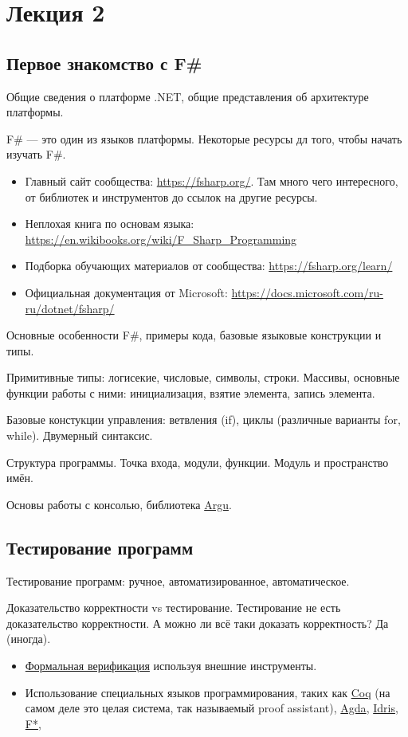 \section{Лекция 2}

\subsection{Первое знакомство с F\#}

    Общие сведения о платформе .NET, общие представления об архитектуре платформы.

    F\# --- это один из языков платформы. 
    Некоторые ресурсы дл того, чтобы начать изучать F\#.
    \begin{itemize}
    	\item Главный сайт сообщества: \url{https://fsharp.org/}. Там много чего интересного, от библиотек и инструментов до ссылок на другие ресурсы. 
    	\item Неплохая книга по основам языка: \url{https://en.wikibooks.org/wiki/F_Sharp_Programming}
    	\item Подборка обучающих материалов от сообщества: \url{https://fsharp.org/learn/}
    	\item Официальная документация от Microsoft: \url{https://docs.microsoft.com/ru-ru/dotnet/fsharp/}
    \end{itemize}
    Основные особенности F\#, примеры кода, базовые языковые конструкции и типы.

    Примитивные типы: логисекие, числовые, символы, строки.
    Массивы, основные функции работы с ними: инициализация, взятие элемента, запись элемента.

    Базовые констукции управления: ветвления (if), циклы (различные варианты for, while). 
    Двумерный синтаксис.

    Структура программы. Точка входа, модули, функции. Модуль и пространство имён.

    Основы работы с консолью, библиотека \href{https://fsprojects.github.io/Argu/}{Argu}. 

\subsection{Тестирование программ}
    Тестирование программ: ручное, автоматизированное, автоматическое. 

    Доказательство корректности vs тестирование. Тестирование не есть доказательство корректности.
    А можно ли всё таки доказать корректность? Да (иногда).
    \begin{itemize}
    	\item \href{https://en.wikipedia.org/wiki/Formal_verification#Formal_verification_for_software}{Формальная верификация} используя внешние инструменты.
        \item Использование специальных языков программирования, таких как \href{https://coq.inria.fr/}{Coq} (на самом деле это целая система, так называемый proof assistant), \href{https://wiki.portal.chalmers.se/agda/pmwiki.php}{Agda}, \href{https://www.idris-lang.org/}{Idris}, \href{https://www.fstar-lang.org/}{F*},   
    \end{itemize}

